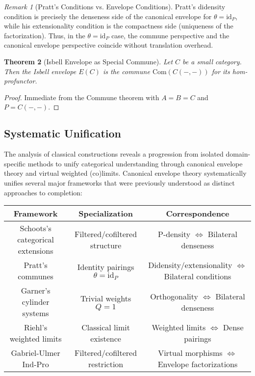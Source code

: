 \documentclass[11pt]{article}
\theoremstyle{plain}
\newtheorem{theorem}{Theorem}[section]
\theoremstyle{definition}
\theoremstyle{remark}
\newtheorem{remark}[theorem]{Remark}
\begin{document}
\begin{remark}[Pratt's Conditions vs. Envelope Conditions]
Pratt's didensity condition is precisely the denseness side of the canonical envelope for $\theta = \mathrm{id}_P$, while his extensionality condition is the compactness side (uniqueness of the factorization). Thus, in the $\theta = \mathrm{id}_P$ case, the commune perspective and the canonical envelope perspective coincide without translation overhead.
\end{remark}

\begin{theorem}[Isbell Envelope as Special Commune]
Let $C$ be a small category. Then the Isbell envelope $E(C)$ is the commune $\mathrm{Com}(C(-,-))$ for its hom-profunctor.
\end{theorem}

\begin{proof}
Immediate from the Commune theorem with $A = B = C$ and $P = C(-,-)$.
\end{proof}

\subsection{Systematic Unification}

The analysis of classical constructions reveals a progression from isolated domain-specific methods to unify categorical understanding through canonical envelope theory and virtual weighted (co)limits. Canonical envelope theory systematically unifies several major frameworks that were previously understood as distinct approaches to completion:

\footnotesize
\begin{tabular}{|c|c|c|}
\hline
\textbf{Framework} & \textbf{Specialization} & \textbf{Correspondence} \\
\hline
Schoots's categorical extensions & Filtered/cofiltered structure & P-density $\Leftrightarrow$ Bilateral denseness \\
\hline  
Pratt's communes & Identity pairings $\theta = \mathrm{id}_P$ & Didensity/extensionality $\Leftrightarrow$ Bilateral conditions \\
\hline
Garner's cylinder systems & Trivial weights $Q = 1$ & Orthogonality $\Leftrightarrow$ Bilateral denseness \\
\hline
Riehl's weighted limits & Classical limit existence & Weighted limits $\Leftrightarrow$ Dense pairings \\
\hline
Gabriel-Ulmer Ind-Pro & Filtered/cofiltered restriction & Virtual morphisms $\Leftrightarrow$ Envelope factorizations \\
\hline
\end{tabular}
\normalsize
\end{document}
